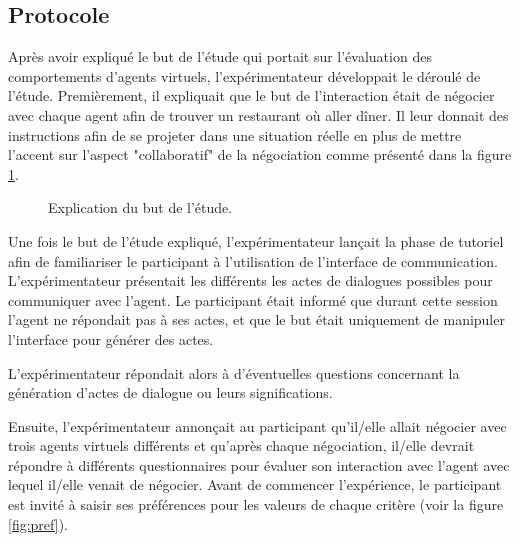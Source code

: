 \subsection{Protocole}
Après avoir expliqué le but de l'étude qui portait sur l'évaluation des comportements d'agents virtuels, l'expérimentateur développait le déroulé de l'étude. 
Premièrement, il expliquait que le but de l'interaction était de négocier avec chaque agent afin de trouver un restaurant où aller dîner. Il leur donnait des instructions afin de se projeter dans une situation réelle en plus de mettre l'accent sur l'aspect "collaboratif" de la négociation comme présenté dans la figure \ref{fig:instruction}.

\begin{figure}[h]
		
		\caption{\label{fig:instruction}Explication du but de l'étude.}
	\end{figure}
	
	
	Une fois le but de l'étude expliqué, l'expérimentateur lançait la phase de tutoriel afin de familiariser le participant à l'utilisation de l'interface de communication. L'expérimentateur présentait les différents les actes de dialogues possibles pour communiquer avec l'agent. 	
	Le participant était informé que durant cette session l'agent ne répondait pas à ses actes, et que le but était uniquement de manipuler l'interface pour générer des actes. 
	
	L’expérimentateur répondait alors à d’éventuelles questions concernant la génération d'actes de dialogue ou leurs significations.
	
	Ensuite, l’expérimentateur annonçait au participant qu’il/elle allait négocier avec trois  agents virtuels différents et
	qu’après chaque négociation, il/elle devrait répondre à différents questionnaires pour évaluer son interaction avec l’agent avec lequel il/elle venait de négocier.  Avant de commencer l'expérience, le participant est invité à saisir ses préférences pour les valeurs de chaque critère (voir la figure \ref{fig:pref}).
	
